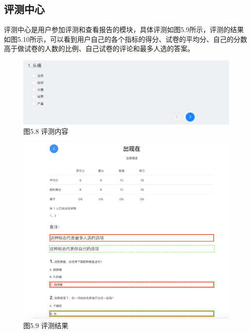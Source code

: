 \subsection{评测中心}

评测中心是用户参加评测和查看报告的模块，具体评测如图5.9所示，评测的结果如图5.10所示，可以看到用户自己的各个指标的得分、试卷的平均分、自己的分数高于做试卷的人数的比例、自己试卷的评论和最多人选的答案。

\begin{figure}[thbp!]
	\centering
	\includegraphics[width=0.7\linewidth]{figure/test_main}
	\label{fig:test_main} \\
	图5.8 评测内容
\end{figure}

\begin{figure}[thbp!]
	\centering
	\includegraphics[height=0.7\linewidth]{figure/result_main}
	\label{fig:result_main} \\
	图5.9 评测结果
\end{figure}

